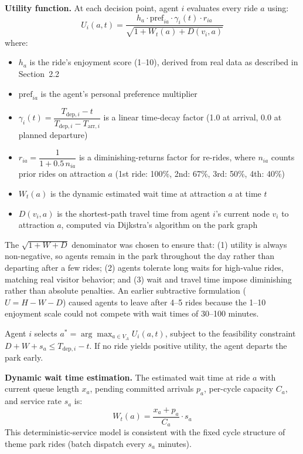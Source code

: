 \documentclass[11pt]{article}
\begin{document}
\textbf{Utility function.} At each decision point, agent $i$ evaluates every ride $a$ using:
\[
U_i(a, t) = \frac{h_a \cdot \text{pref}_{ia} \cdot \gamma_i(t) \cdot r_{ia}}{\sqrt{1 + W_t(a) + D(v_i, a)}}
\]
where:
\begin{itemize}[nosep]
    \item $h_a$ is the ride's enjoyment score (1--10), derived from real data as described in Section~2.2
    \item $\text{pref}_{ia}$ is the agent's personal preference multiplier
    \item $\gamma_i(t) = \dfrac{T_{\text{dep},i} - t}{T_{\text{dep},i} - T_{\text{arr},i}}$ is a linear time-decay factor (1.0 at arrival, 0.0 at planned departure)
    \item $r_{ia} = \dfrac{1}{1 + 0.5\, n_{ia}}$ is a diminishing-returns factor for re-rides, where $n_{ia}$ counts prior rides on attraction $a$ (1st ride: 100\%, 2nd: 67\%, 3rd: 50\%, 4th: 40\%)
    \item $W_t(a)$ is the dynamic estimated wait time at attraction $a$ at time $t$
    \item $D(v_i, a)$ is the shortest-path travel time from agent $i$'s current node $v_i$ to attraction $a$, computed via Dijkstra's algorithm on the park graph
\end{itemize}

The $\sqrt{1 + W + D}$ denominator was chosen to ensure that: (1) utility is always non-negative, so agents remain in the park throughout the day rather than departing after a few rides; (2) agents tolerate long waits for high-value rides, matching real visitor behavior; and (3) wait and travel time impose diminishing rather than absolute penalties. An earlier subtractive formulation ($U = H - W - D$) caused agents to leave after 4--5 rides because the 1--10 enjoyment scale could not compete with wait times of 30--100 minutes.

Agent $i$ selects $a^* = \arg\max_{a \in V_A} U_i(a, t)$, subject to the feasibility constraint $D + W + s_a \leq T_{\text{dep},i} - t$. If no ride yields positive utility, the agent departs the park early.

\textbf{Dynamic wait time estimation.} The estimated wait time at ride $a$ with current queue length $x_a$, pending committed arrivals $p_a$, per-cycle capacity $C_a$, and service rate $s_a$ is:
\[
W_t(a) = \frac{x_a + p_a}{C_a} \cdot s_a
\]
This deterministic-service model is consistent with the fixed cycle structure of theme park rides (batch dispatch every $s_a$ minutes).
\end{document}
